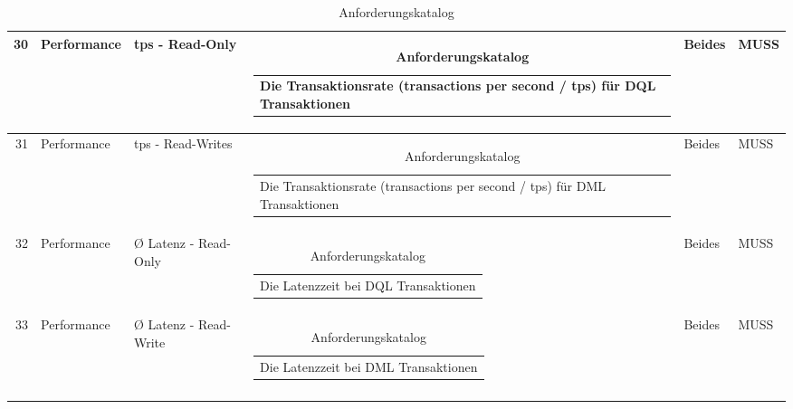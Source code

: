 {\begin{longtable}[H]{rlllll}
30 & Performance & tps - Read-Only & \begin{tabular}[c]{@{}l@{}}Die Transaktionsrate (transactions per second / tps) für DQL Transaktionen\end{tabular} & Beides & MUSS \\ \midrule
31 & Performance & tps - Read-Writes & \begin{tabular}[c]{@{}l@{}}Die Transaktionsrate (transactions per second / tps) für DML Transaktionen\end{tabular} & Beides & MUSS \\ \midrule
32 & Performance & Ø Latenz - Read-Only & \begin{tabular}[c]{@{}l@{}}Die Latenzzeit bei DQL Transaktionen\end{tabular} & Beides & MUSS \\ \midrule
33 & Performance & Ø Latenz - Read-Write & \begin{tabular}[c]{@{}l@{}}Die Latenzzeit bei DML Transaktionen\end{tabular} & Beides & MUSS \\ \midrule
\caption{Anforderungskatalog} \label{anforderungskatalog}
\end{longtable}

}